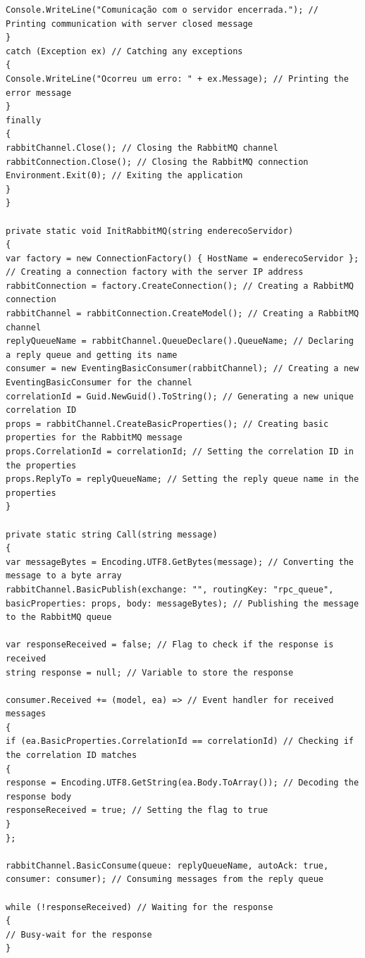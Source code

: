 \documentclass[12pt]{article}
\begin{document}
{\begin{verbatim}
Console.WriteLine("Comunicação com o servidor encerrada."); // Printing communication with server closed message
}
catch (Exception ex) // Catching any exceptions
{
Console.WriteLine("Ocorreu um erro: " + ex.Message); // Printing the error message
}
finally
{
rabbitChannel.Close(); // Closing the RabbitMQ channel
rabbitConnection.Close(); // Closing the RabbitMQ connection
Environment.Exit(0); // Exiting the application
}
}

private static void InitRabbitMQ(string enderecoServidor)
{
var factory = new ConnectionFactory() { HostName = enderecoServidor }; // Creating a connection factory with the server IP address
rabbitConnection = factory.CreateConnection(); // Creating a RabbitMQ connection
rabbitChannel = rabbitConnection.CreateModel(); // Creating a RabbitMQ channel
replyQueueName = rabbitChannel.QueueDeclare().QueueName; // Declaring a reply queue and getting its name
consumer = new EventingBasicConsumer(rabbitChannel); // Creating a new EventingBasicConsumer for the channel
correlationId = Guid.NewGuid().ToString(); // Generating a new unique correlation ID
props = rabbitChannel.CreateBasicProperties(); // Creating basic properties for the RabbitMQ message
props.CorrelationId = correlationId; // Setting the correlation ID in the properties
props.ReplyTo = replyQueueName; // Setting the reply queue name in the properties
}

private static string Call(string message)
{
var messageBytes = Encoding.UTF8.GetBytes(message); // Converting the message to a byte array
rabbitChannel.BasicPublish(exchange: "", routingKey: "rpc_queue", basicProperties: props, body: messageBytes); // Publishing the message to the RabbitMQ queue

var responseReceived = false; // Flag to check if the response is received
string response = null; // Variable to store the response

consumer.Received += (model, ea) => // Event handler for received messages
{
if (ea.BasicProperties.CorrelationId == correlationId) // Checking if the correlation ID matches
{
response = Encoding.UTF8.GetString(ea.Body.ToArray()); // Decoding the response body
responseReceived = true; // Setting the flag to true
}
};

rabbitChannel.BasicConsume(queue: replyQueueName, autoAck: true, consumer: consumer); // Consuming messages from the reply queue

while (!responseReceived) // Waiting for the response
{
// Busy-wait for the response
}


\end{verbatim}}
\end{document}
